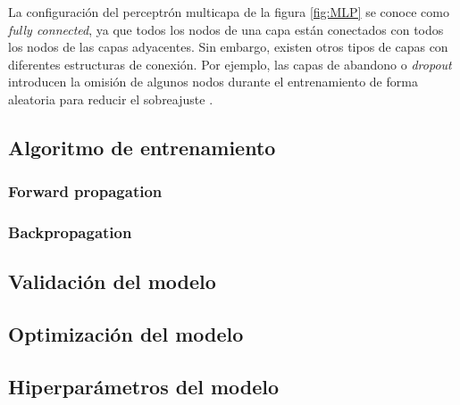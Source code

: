 La configuración del perceptrón multicapa de la figura \ref{fig:MLP} se conoce como \emph{fully connected}, ya que todos 
los nodos de una capa están conectados con todos los nodos de las capas adyacentes. Sin embargo, existen otros tipos de 
capas con diferentes estructuras de conexión. Por ejemplo, las capas de abandono o \emph{dropout} introducen la omisión de 
algunos nodos durante el entrenamiento de forma aleatoria para reducir el sobreajuste \citep{CITE:44} \citep{CITE:45}.



\subsection{Algoritmo de entrenamiento}

\subsubsection{Forward propagation}
\subsubsection{Backpropagation}

\subsection{Validación del modelo}

\subsection{Optimización del modelo}

\subsection{Hiperparámetros del modelo}

